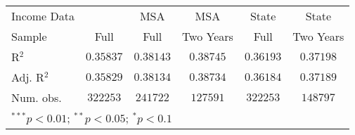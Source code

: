 \begin{tabular}{l c c c c c}
Income Data          &                  & MSA              & MSA              & State            & State            \\
Sample               & Full             & Full             & Two Years        & Full             & Two Years        \\
R$^2$                & $0.35837$        & $0.38143$        & $0.38745$        & $0.36193$        & $0.37198$        \\
Adj. R$^2$           & $0.35829$        & $0.38134$        & $0.38734$        & $0.36184$        & $0.37189$        \\
Num. obs.            & $322253$         & $241722$         & $127591$         & $322253$         & $148797$         \\
\hline
\multicolumn{6}{l}{\scriptsize{$^{***}p<0.01$; $^{**}p<0.05$; $^{*}p<0.1$}}
\end{tabular}
